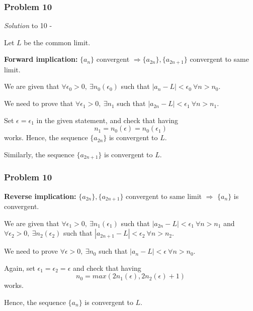 \documentclass[
	11pt, %
]{beamer}
\begin{document}
\begin{frame}[t]
	\frametitle{Problem 10}

	\textit{Solution} to 10 -

	\bigskip

	Let $L$ be the common limit.

	\medskip

	\textbf{Forward implication:} $\{a_n\}$ convergent $\Rightarrow \{a_{2n}\}, \{a_{2n+1}\}$ convergent to same limit.
	
	\bigskip
	
	We are given that $\forall \epsilon_0 > 0, ~ \exists n_0(\epsilon_0)$ such that $|a_n - L| < \epsilon_0 ~ \forall n > n_0$.

	\medskip

	We need to prove that $\forall \epsilon_1 > 0, ~ \exists n_1$ such that $|a_{2n} - L| < \epsilon_1 ~ \forall n > n_1$.

	\medskip

	Set $\epsilon = \epsilon_1$ in the given statement, and check that having \[n_1 = n_0(\epsilon) = n_0(\epsilon_1)\] works. Hence, the sequence $\{a_{2n}\}$ is convergent to $L$.

	\medskip

	Similarly, the sequence $\{a_{2n+1}\}$ is convergent to $L$.
	
\end{frame}

\begin{frame}[t]
	\frametitle{Problem 10}

	\textbf{Reverse implication:} $\{a_{2n}\}, \{a_{2n+1}\}$ convergent to same limit $\Rightarrow$ $\{a_n\}$ is convergent.
	
	\bigskip

	We are given that $\forall \epsilon_1 > 0, ~ \exists n_1(\epsilon_1)$ such that $|a_{2n} - L| < \epsilon_1 ~ \forall n > n_1$ and $\forall \epsilon_2 > 0, ~ \exists n_2(\epsilon_2)$ such that $|a_{2n+1} - L| < \epsilon_2 ~ \forall n > n_2$.

	\medskip

	We need to prove $\forall \epsilon > 0, ~ \exists n_0$ such that $|a_n - L| < \epsilon ~ \forall n > n_0$.

	\medskip

	Again, set $\epsilon_1 = \epsilon_2 = \epsilon$ and check that having \[n_0 = max(2n_1(\epsilon), 2n_2(\epsilon)+1)\] works. 

	\medskip

	Hence, the sequence $\{a_n\}$ is convergent to $L$.
	
	
	
\end{frame}
\end{document}
